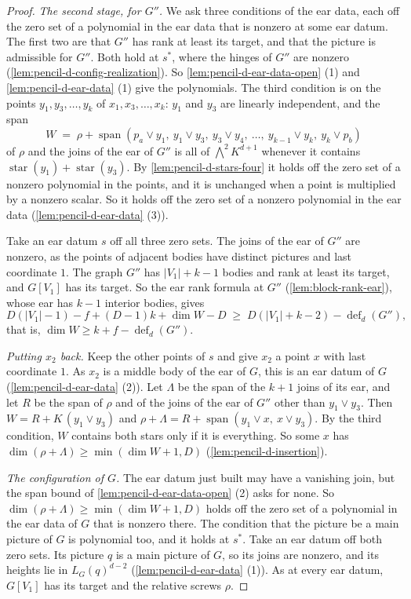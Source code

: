 \begin{proof}
  \emph{The second stage, for $G''$.} We ask three conditions of the ear
  data, each off the zero set of a polynomial in the ear data that is
  nonzero at some ear datum. The first two are that $G''$ has rank at
  least its target, and that the picture is admissible for $G''$. Both
  hold at $s^*$, where the hinges of $G''$ are nonzero
  (\cref{lem:pencil-d-config-realization}). So
  \cref{lem:pencil-d-ear-data-open} (1) and \cref{lem:pencil-d-ear-data}
  (1) give the polynomials. The third condition is on the points
  $y_1, y_3, \dots, y_k$ of $x_1, x_3, \dots, x_k$: $y_1$ and $y_3$ are
  linearly independent, and the span
  \[
    W \;=\; \rho + \operatorname{span}(p_a \vee y_1,\ y_1 \vee y_3,\
    y_3 \vee y_4,\ \dots,\ y_{k-1} \vee y_k,\ y_k \vee p_b)
  \]
  of $\rho$ and the joins of the ear of $G''$ is all of
  $\bigwedge^2 K^{d+1}$ whenever it contains
  $\operatorname{star}(y_1) + \operatorname{star}(y_3)$. By
  \cref{lem:pencil-d-stars-four} it holds off the zero set of a nonzero
  polynomial in the points, and it is unchanged when a point is
  multiplied by a nonzero scalar. So it holds off the zero set of a
  nonzero polynomial in the ear data (\cref{lem:pencil-d-ear-data} (3)).

  Take an ear datum $s$ off all three zero sets. The joins of the ear of
  $G''$ are nonzero, as the points of adjacent bodies have distinct
  pictures and last coordinate $1$. The graph $G''$ has $|V_1| + k - 1$
  bodies and rank at least its target, and $G[V_1]$ has its target. So
  the ear rank formula at $G''$ (\cref{lem:block-rank-ear}), whose ear
  has $k - 1$ interior bodies, gives
  \[
    D(|V_1| - 1) - f + (D - 1)k + \dim W - D \;\ge\;
    D(|V_1| + k - 2) - \operatorname{def}_d(G''),
  \]
  that is, $\dim W \ge k + f - \operatorname{def}_d(G'')$.

  \emph{Putting $x_2$ back.} Keep the other points of $s$ and give $x_2$
  a point $x$ with last coordinate $1$. As $x_2$ is a middle body of the
  ear of $G$, this is an ear datum of $G$ (\cref{lem:pencil-d-ear-data}
  (2)). Let $\Lambda$ be the span of the $k + 1$ joins of its ear, and
  let $R$ be the span of $\rho$ and of the joins of the ear of $G''$
  other than $y_1 \vee y_3$. Then $W = R + K\,(y_1 \vee y_3)$ and
  $\rho + \Lambda = R + \operatorname{span}(y_1 \vee x,\ x \vee y_3)$. By
  the third condition, $W$ contains both stars only if it is
  everything. So some $x$ has
  $\dim(\rho + \Lambda) \ge \min(\dim W + 1, D)$
  (\cref{lem:pencil-d-insertion}).

  \emph{The configuration of $G$.} The ear datum just built may have a
  vanishing join, but the span bound of \cref{lem:pencil-d-ear-data-open}
  (2) asks for none. So $\dim(\rho + \Lambda) \ge \min(\dim W + 1, D)$
  holds off the zero set of a polynomial in the ear data of $G$ that is
  nonzero there. The condition that the picture be a main picture of $G$
  is polynomial too, and it holds at $s^*$. Take an ear datum off both
  zero sets. Its picture $q$ is a main picture of $G$, so its joins are
  nonzero, and its heights lie in $L_G(q)^{d-2}$
  (\cref{lem:pencil-d-ear-data} (1)). As at every ear datum, $G[V_1]$ has
  its target and the relative screws $\rho$.


\end{proof}
